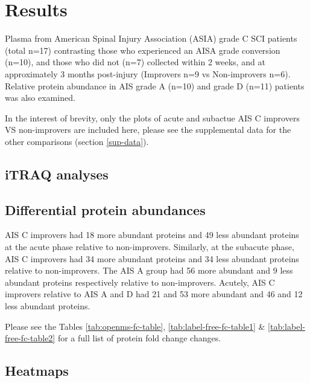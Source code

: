 \documentclass[
]{article}
\begin{document}
\hypertarget{results-1}{%
\section{Results}\label{results-1}}

Plasma from American Spinal Injury Association (ASIA) grade C SCI patients (total n=17) contrasting those who experienced an AISA grade conversion (n=10), and those who did not (n=7) collected within 2 weeks, and at approximately 3 months post-injury (Improvers n=9 vs Non-improvers n=6).
Relative protein abundance in AIS grade A (n=10) and grade D (n=11) patients was also examined.

In the interest of brevity, only the plots of acute and subactue AIS C improvers VS non-improvers are included here, please see the supplemental data for the other comparisons (section \ref{sup-data}).





\hypertarget{itraq-analyses}{%
\subsection{iTRAQ analyses}\label{itraq-analyses}}

\hypertarget{differential-protein-abundances}{%
\subsection{Differential protein abundances}\label{differential-protein-abundances}}

AIS C improvers had 18 more abundant proteins and 49 less abundant proteins at the acute phase relative to non-improvers.
Similarly, at the subacute phase, AIS C improvers had 34 more abundant proteins and 34 less abundant proteins relative to non-improvers.
The AIS A group had 56 more abundant and 9 less abundant proteins respectively relative to non-improvers.
Acutely, AIS C improvers relative to AIS A and D had 21 and 53 more abundant and 46 and 12 less abundant proteins.

Please see the Tables \ref{tab:openms-fc-table}, \ref{tab:label-free-fc-table1} \& \ref{tab:label-free-fc-table2} for a full list of protein fold change changes.

\hypertarget{heatmaps-chap3}{%
\subsection{Heatmaps}\label{heatmaps-chap3}}
\end{document}
